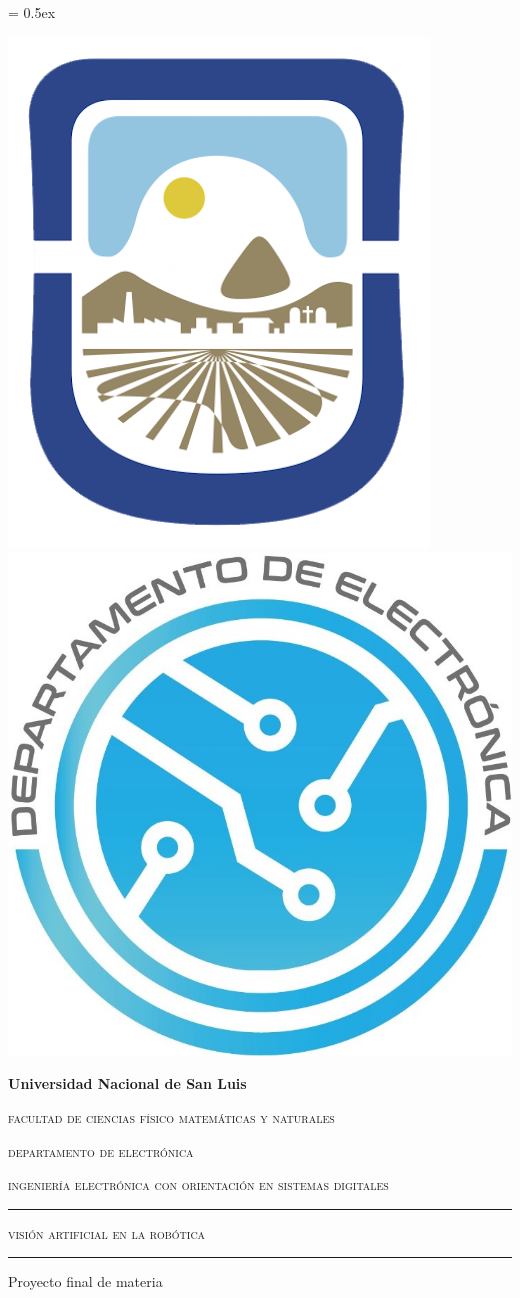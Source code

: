 \documentclass[11pt,a4paper]{article}
\begin{document}
	\renewcommand{\tablename}{Tabla}
	\extrarowheight = 0.5ex
	
	{\begin{titlepage} %
			\centering
			{\includegraphics[width=2 cm]{imagenes/logounsl.png}
				\hspace{1cm}
				\includegraphics[width=2 cm]{imagenes/logo_depto.jpg}\par} 
			
			\vspace{1cm}
			
			{\bfseries\LARGE Universidad Nacional de San Luis \par}	
			
			\vspace{2cm}
			
			{\scshape\LARGE facultad de ciencias físico matemáticas y naturales\par}
			
			{\scshape\LARGE departamento de electrónica\par}
			
			\vspace{1cm}
			
			{\scshape\large ingeniería electrónica con orientación en sistemas digitales\par}
			
			\vspace{1cm}
			
			{\rule{16cm}{0.5pt} \par}
			
			{\scshape\Huge visión artificial en la robótica\par}
			
			{\rule{16cm}{0.5pt} \par}
			
			\vspace{1cm}
			
			{\LARGE Proyecto final de materia \par}
			
			\vfill
			

\end{titlepage}}
\end{document}

